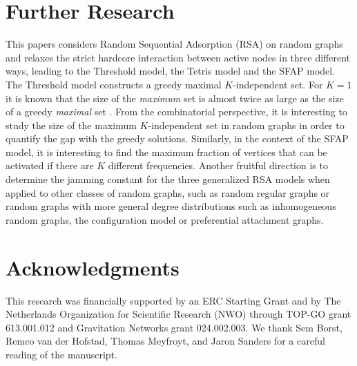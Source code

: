 \documentclass[11pt,a4paper, reqno]{article}
\begin{document}
\section{Further Research}\label{sec:fu}
 This papers considers Random Sequential Adsorption (RSA) on random graphs and relaxes the strict hardcore interaction between active nodes in three different ways, leading to the Threshold model, the Tetris model and the SFAP model. The Threshold model constructs a greedy maximal $K$-independent set. For $K=1$ it is known that the size of the \emph{maximum} set is almost twice as large as the size of a greedy \emph{maximal} set \cite{F90,CE15}. From the combinatorial perspective, it is interesting to study the size of the maximum $K$-independent set in random graphs in order to quantify the gap with the greedy solutions. Similarly, in the context of the SFAP model, it is interesting to find the maximum fraction of vertices that can be activated if there are $K$ different frequencies. Another fruitful direction is to determine the jamming constant for the three generalized RSA models when applied to other classes of random graphs, such as random regular graphs or random graphs with more general degree distributions such as inhomogeneous random graphs, the configuration model or preferential attachment graphs.

\section*{Acknowledgments}
This research was financially supported by an ERC Starting Grant and by The Netherlands Organization for Scientific Research (NWO) through TOP-GO grant 613.001.012 and Gravitation Networks grant 024.002.003.
We thank Sem Borst, Remco van der Hofstad, Thomas  Meyfroyt, and  Jaron Sanders for a careful reading of the manuscript.




\end{document}
